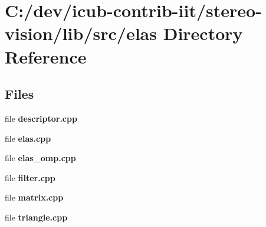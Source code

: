 \section{C\+:/dev/icub-\/contrib-\/iit/stereo-\/vision/lib/src/elas Directory Reference}
\label{dir_f39c8903d404d794e705ad03c67ee29e}
\subsection*{Files}
\begin{DoxyCompactItemize}
\item 
file {\bfseries descriptor.\+cpp}
\item 
file {\bfseries elas.\+cpp}
\item 
file {\bfseries elas\+\_\+omp.\+cpp}
\item 
file {\bfseries filter.\+cpp}
\item 
file {\bfseries matrix.\+cpp}
\item 
file {\bfseries triangle.\+cpp}
\end{DoxyCompactItemize}
